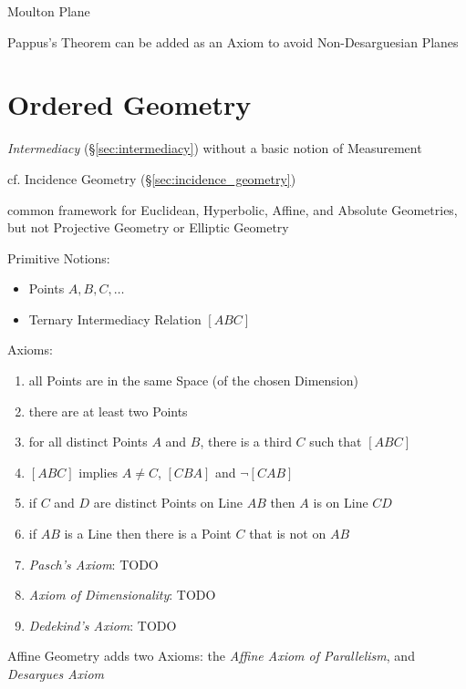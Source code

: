 Moulton Plane

Pappus's Theorem can be added as an Axiom to avoid Non-Desarguesian Planes



\section{Ordered Geometry}\label{sec:ordered_geometry}

\emph{Intermediacy} (\S\ref{sec:intermediacy}) without a basic notion of
Measurement

\fist cf. Incidence Geometry (\S\ref{sec:incidence_geometry})

common framework for Euclidean, Hyperbolic, Affine, and Absolute Geometries, but
not Projective Geometry or Elliptic Geometry

Primitive Notions:
\begin{itemize}
  \item Points $A, B, C, \ldots$
  \item Ternary Intermediacy Relation $[ABC]$
\end{itemize}

Axioms:
\begin{enumerate}
  \item all Points are in the same Space (of the chosen Dimension)
  \item there are at least two Points
  \item for all distinct Points $A$ and $B$, there is a third $C$ such that
    $[ABC]$
  \item $[ABC]$ implies $A \neq C$, $[CBA]$ and $\neg[CAB]$
  \item if $C$ and $D$ are distinct Points on Line $AB$ then $A$ is on Line $CD$
  \item if $AB$ is a Line then there is a Point $C$ that is not on $AB$
  \item \emph{Pasch's Axiom}: TODO
  \item \emph{Axiom of Dimensionality}: TODO
  \item \emph{Dedekind's Axiom}: TODO
\end{enumerate}

Affine Geometry adds two Axioms: the \emph{Affine Axiom of Parallelism}, and
\emph{Desargues Axiom}



